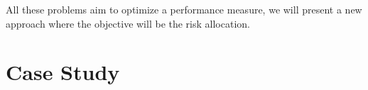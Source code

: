 All these problems aim to optimize a performance measure, we will present a new approach where the objective will be the risk allocation.















































\section{Case Study}